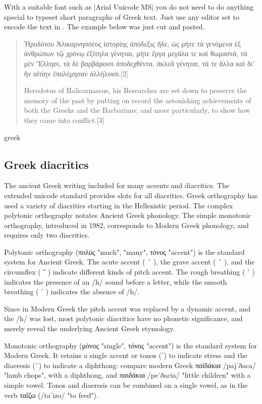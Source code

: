 With a suitable font such as |Arial Unicode MS| you do not need to do anything special to typeset short paragraphs of Greek text. Just use any editor set to encode the text in \utfviii. The example below was just cut and pasted.  

\topline
\begin{quote}
Ἡροδότου Ἁλικαρνησσέος ἱστορίης ἀπόδεξις ἥδε, ὡς μήτε τὰ γενόμενα ἐξ ἀνθρώπων τῷ χρόνῳ ἐξίτηλα γένηται, μήτε ἔργα μεγάλα τε καὶ θωμαστά, τὰ μὲν Ἕλλησι, τὰ δὲ βαρβάροισι ἀποδεχθέντα, ἀκλεᾶ γένηται, τὰ τε ἄλλα καὶ δι' ἣν αἰτίην ἐπολέμησαν ἀλλήλοισι.[2]

Herodotus of Halicarnassus, his Researches are set down to preserve the memory of the past by putting on record the astonishing achievements of both the Greeks and the Barbarians; and more particularly, to show how they came into conflict.[3]
\end{quote}
\bottomline

\begin{scriptexample}{greek}
\end{scriptexample}

\subsection{Greek diacritics}

The ancient Greek writing included for many accents and diacritics. The extended unicode standard provides slots for all diacritics. Greek orthography has used a variety of diacritics starting in the Hellenistic period. The complex polytonic orthography notates Ancient Greek phonology. The simple monotonic orthography, introduced in 1982, corresponds to Modern Greek phonology, and requires only two diacritics.

Polytonic orthography (πολύς "much", "many", τόνος "accent") is the standard system for Ancient Greek. The acute accent ( ´ ), the grave accent ( ` ), and the circumflex ( ῀ ) indicate different kinds of pitch accent. The rough breathing ( ῾ ) indicates the presence of an /h/ sound before a letter, while the smooth breathing ( ᾿ ) indicates the absence of /h/.

Since in Modern Greek the pitch accent was replaced by a dynamic accent, and the /h/ was lost, most polytonic diacritics have no phonetic significance, and merely reveal the underlying Ancient Greek etymology.

Monotonic orthography (μόνος "single", τόνος "accent") is the standard system for Modern Greek. It retains a single accent or tonos (΄) to indicate stress and the diaeresis (¨) to indicate a diphthong: compare modern Greek παϊδάκια /pajˈðaca/ "lamb chops", with a diphthong, and παιδάκια /peˈðacia/ "little children" with a simple vowel. Tonos and diaeresis can be combined on a single vowel, as in the verb ταΐζω (/taˈizo/ "to feed").


